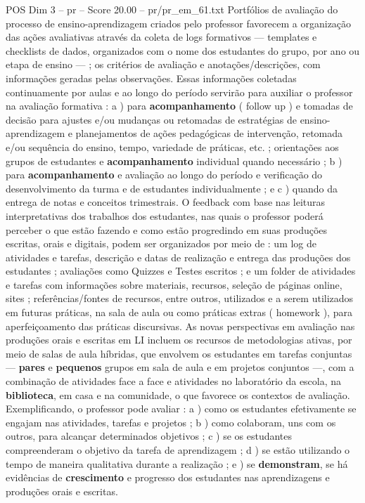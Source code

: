 \begin{textsample}{POS Dim 3 – pr – Score 20.00 – pr/pr\_em\_61.txt}
Portfólios de avaliação do processo de ensino-aprendizagem criados pelo professor favorecem a organização das ações avaliativas através da coleta de logs formativos — templates e checklists de dados, organizados com o nome dos estudantes do grupo, por ano ou etapa de ensino — ; os critérios de avaliação e anotações/descrições, com informações geradas pelas observações.
Essas informações coletadas continuamente por aulas e ao longo do período servirão para auxiliar o professor na avaliação formativa : a ) para \textbf{acompanhamento} ( follow up ) e tomadas de decisão para ajustes e/ou mudanças ou retomadas de estratégias de ensino-aprendizagem e planejamentos de ações pedagógicas de intervenção, retomada e/ou sequência do ensino, tempo, variedade de práticas, etc. ; orientações aos grupos de estudantes e \textbf{acompanhamento} individual quando necessário ; b ) para \textbf{acompanhamento} e avaliação ao longo do período e verificação do desenvolvimento da turma e de estudantes individualmente ; e c ) quando da entrega de notas e conceitos trimestrais.
O feedback com base nas leituras interpretativas dos trabalhos dos estudantes, nas quais o professor poderá perceber o que estão fazendo e como estão progredindo em suas produções escritas, orais e digitais, podem ser organizados por meio de : um log de atividades e tarefas, descrição e datas de realização e entrega das produções dos estudantes ; avaliações como Quizzes e Testes escritos ; e um folder de atividades e tarefas com informações sobre materiais, recursos, seleção de páginas online, sites ; referências/fontes de recursos, entre outros, utilizados e a serem utilizados em futuras práticas, na sala de aula ou como práticas extras ( homework ), para aperfeiçoamento das práticas discursivas.
As novas perspectivas em avaliação nas produções orais e escritas em LI incluem os recursos de metodologias ativas, por meio de salas de aula híbridas, que envolvem os estudantes em tarefas conjuntas — \textbf{pares} e \textbf{pequenos} grupos em sala de aula e em projetos conjuntos —, com a combinação de atividades face a face e atividades no laboratório da escola, na \textbf{biblioteca}, em casa e na comunidade, o que favorece os contextos de avaliação.
Exemplificando, o professor pode avaliar : a ) como os estudantes efetivamente se engajam nas atividades, tarefas e projetos ; b ) como colaboram, uns com os outros, para alcançar determinados objetivos ; c ) se os estudantes compreenderam o objetivo da tarefa de aprendizagem ; d ) se estão utilizando o tempo de maneira qualitativa durante a realização ; e ) se \textbf{demonstram}, se há evidências de \textbf{crescimento} e progresso dos estudantes nas aprendizagens e produções orais e escritas.

\end{textsample}

